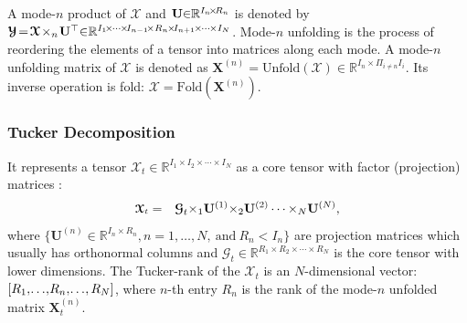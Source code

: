 \documentclass[letterpaper]{article} %
\numberwithin{theorem}{section}
\newcommand{\ten}[1]{ \boldsymbol{\mathcal #1}}
\begin{document}
A mode-$n$ product of  $\ten{X}$ and   $  \mathbf U\hspace{-0.1cm} \in\hspace{-0.1cm} \mathbb{R}^{I_n\hspace{-0.05cm} \times \hspace{-0.05cm}R_n}$   is denoted by  $ \ten{Y} \hspace{-0.05cm} = \hspace{-0.05cm} \ten{X} \hspace{-0.05cm} \times_n \hspace{-0.05cm} \mathbf U^\top \hspace{-0.09cm}\in \hspace{-0.09cm}\mathbb{R}^{I_1 \hspace{-0.05cm} \times \hspace{-0.025cm} \cdots \hspace{-0.025cm} \times \hspace{-0.05cm} I_{n-1} \hspace{-0.05cm} \times R_n \hspace{-0.03cm}  \times\hspace{-0.05cm}  I_{n+1} \hspace{-0.025cm}  \times \hspace{-0.025cm} \cdots \hspace{-0.025cm} \times I_N}$.
Mode-$n$ unfolding is the process of reordering the elements of a tensor	into matrices along each mode. A mode-$n$ unfolding matrix of  $\ten{X}$ is denoted as $\mathbf X^{(n)}  = \text{Unfold} (\ten{X})  \in \mathbb{R}^{I_n \times \Pi_{i \neq n} I_{i}  }$. Its inverse operation is fold: $\ten{X}  = \text{Fold} (\mathbf X^{(n)})$.


\subsubsection{Tucker Decomposition}
It represents
a  tensor  $\ten{X}_t \in \mathbb{R}^{I_1 \times I_2  \times \cdots  \times I_N}$   as a core tensor with factor (projection) matrices \cite{kolda2009tensor}:
\begin{equation}
\begin{aligned}
\small
\label{TuckerModel0}
\ten{X}_t &   =  &
\ten{G}_t {\times_1} \mathbf{U}^{(1)}  {\times_2}  \mathbf{U}^{(2)}  \cdots {\times_N} \mathbf{U}^{(N)},
\end{aligned}
\end{equation}
where $ \{\mathbf{U}^{(n)}  \in \mathbb{R}^{I_n \times  R_n}, n= 1,  \ldots, N, \ \text{and} \ R_n < I_n \}$
are projection  matrices which usually has orthonormal columns and $\ten{G}_t \in \mathbb{R}^{R_1 \times R_2 \times  \cdots \times R_N}$ is the core tensor with lower dimensions.
The {Tucker-rank} of the  $\ten{X}_t$ is an $N$-dimensional vector: $[R_1, \hspace{-0.05cm} \ldots \hspace{-0.05cm}, \hspace{-0.05cm} R_n,  \hspace{-0.05cm}\ldots \hspace{-0.05cm}, R_N]$, where $n$-th entry $R_n$ is the rank of the mode-$n$ unfolded matrix $\mathbf{X}{_t^{(n)}}$.
\end{document}
